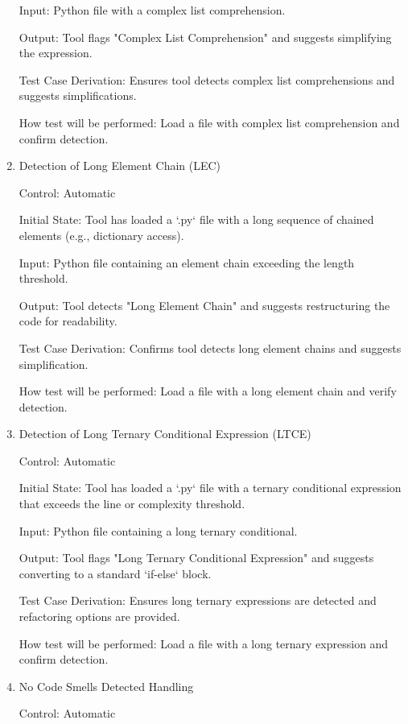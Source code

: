 \documentclass[12pt, titlepage]{article}
\begin{document}
\begin{enumerate}
Input: Python file with a complex list comprehension.
					
Output: Tool flags "Complex List Comprehension" and suggests simplifying the expression.

Test Case Derivation: Ensures tool detects complex list comprehensions and suggests simplifications.
					
How test will be performed: Load a file with complex list comprehension and confirm detection.

\item{Detection of Long Element Chain (LEC)\\}

Control: Automatic
					
Initial State: Tool has loaded a `.py` file with a long sequence of chained elements (e.g., dictionary access).
					
Input: Python file containing an element chain exceeding the length threshold.
					
Output: Tool detects "Long Element Chain" and suggests restructuring the code for readability.

Test Case Derivation: Confirms tool detects long element chains and suggests simplification.
					
How test will be performed: Load a file with a long element chain and verify detection.

\item{Detection of Long Ternary Conditional Expression (LTCE)\\}

Control: Automatic
					
Initial State: Tool has loaded a `.py` file with a ternary conditional expression that exceeds the line or complexity threshold.
					
Input: Python file containing a long ternary conditional.
					
Output: Tool flags "Long Ternary Conditional Expression" and suggests converting to a standard `if-else` block.

Test Case Derivation: Ensures long ternary expressions are detected and refactoring options are provided.
					
How test will be performed: Load a file with a long ternary expression and confirm detection.


\item{No Code Smells Detected Handling\\}

Control: Automatic


\end{enumerate}
\end{document}
